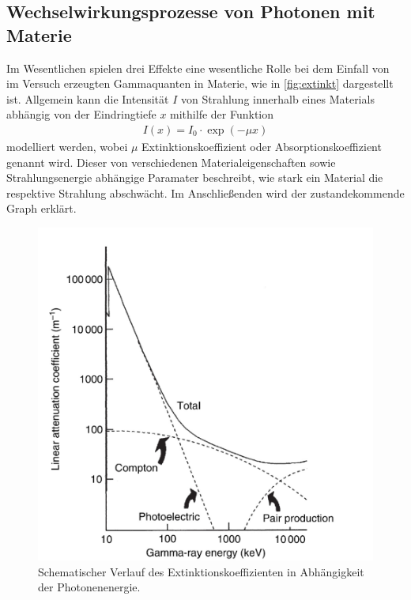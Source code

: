 \documentclass[12pt]{article}
\begin{document}
\subsection{Wechselwirkungsprozesse von Photonen mit Materie}
Im Wesentlichen spielen drei Effekte eine wesentliche Rolle bei dem Einfall von im Versuch erzeugten Gammaquanten in Materie, wie in \autoref{fig:extinkt} dargestellt ist.
Allgemein kann die Intensität $I$ von Strahlung innerhalb eines Materials abhängig von der Eindringtiefe $x$ mithilfe der Funktion
\begin{align}
  I(x) = I_0\cdot\exp{(-\mu x)}
\end{align}
modelliert werden, wobei $\mu$ Extinktionskoeffizient oder Absorptionskoeffizient genannt wird. Dieser von verschiedenen Materialeigenschaften sowie Strahlungsenergie abhängige Paramater beschreibt, wie stark ein Material die respektive Strahlung abschwächt.
Im Anschließenden wird der zustandekommende Graph erklärt.
\begin{figure}[H]
  \centering
  \includegraphics[scale=0.65]{Ressourcen/extinkt.png}
  \caption{Schematischer Verlauf des Extinktionskoeffizienten in Abhängigkeit der Photonenenergie\cite{gilmore}.}
  \label{fig:extinkt}
\end{figure}
\end{document}
